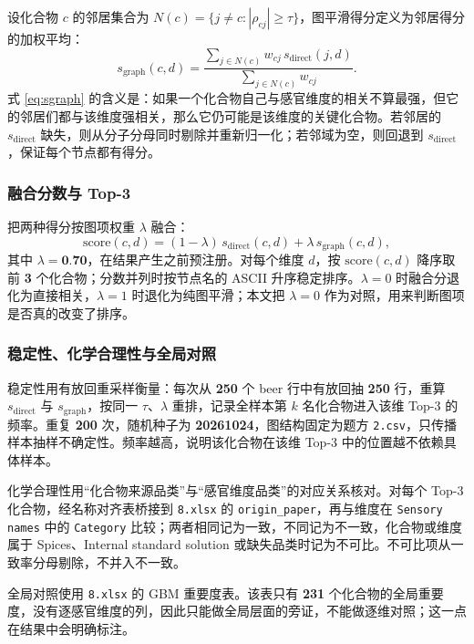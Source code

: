 设化合物 $c$ 的邻居集合为 $N(c)=\{j\ne c:|\rho_{cj}|\ge\tau\}$，图平滑得分定义为邻居得分的加权平均：
\begin{equation}
s_{\mathrm{graph}}(c,d)=\frac{\sum_{j\in N(c)}w_{cj}\,s_{\mathrm{direct}}(j,d)}
{\sum_{j\in N(c)}w_{cj}}.
\label{eq:sgraph}
\end{equation}
式 \eqref{eq:sgraph} 的含义是：如果一个化合物自己与感官维度的相关不算最强，但它的邻居们都与该维度强相关，那么它仍可能是该维度的关键化合物。若邻居的 $s_{\mathrm{direct}}$ 缺失，则从分子分母同时剔除并重新归一化；若邻域为空，则回退到 $s_{\mathrm{direct}}$，保证每个节点都有得分。

\subsubsection{融合分数与 Top-3}

把两种得分按图项权重 $\lambda$ 融合：
\begin{equation}
\mathrm{score}(c,d)=(1-\lambda)\,s_{\mathrm{direct}}(c,d)+
\lambda\,s_{\mathrm{graph}}(c,d),
\label{eq:score}
\end{equation}
其中 $\lambda=\textbf{0.70}$，在结果产生之前预注册。对每个维度 $d$，按 $\mathrm{score}(c,d)$ 降序取前 \textbf{3} 个化合物；分数并列时按节点名的 ASCII 升序稳定排序。$\lambda=0$ 时融合分退化为直接相关，$\lambda=1$ 时退化为纯图平滑；本文把 $\lambda=0$ 作为对照，用来判断图项是否真的改变了排序。

\subsubsection{稳定性、化学合理性与全局对照}

稳定性用有放回重采样衡量：每次从 \textbf{250} 个 beer 行中有放回抽 \textbf{250} 行，重算 $s_{\mathrm{direct}}$ 与 $s_{\mathrm{graph}}$，按同一 $\tau$、$\lambda$ 重排，记录全样本第 $k$ 名化合物进入该维 Top-3 的频率。重复 \textbf{200} 次，随机种子为 \textbf{20261024}，图结构固定为题方 \texttt{2.csv}，只传播样本抽样不确定性。频率越高，说明该化合物在该维 Top-3 中的位置越不依赖具体样本。

化学合理性用“化合物来源品类”与“感官维度品类”的对应关系核对。对每个 Top-3 化合物，经名称对齐表桥接到 \texttt{8.xlsx} 的 \texttt{origin\_paper}，再与维度在 \texttt{Sensory names} 中的 \texttt{Category} 比较；两者相同记为一致，不同记为不一致，化合物或维度属于 Spices、Internal standard solution 或缺失品类时记为不可比。不可比项从一致率分母剔除，不并入不一致。

全局对照使用 \texttt{8.xlsx} 的 GBM 重要度表。该表只有 \textbf{231} 个化合物的全局重要度，没有逐感官维度的列，因此只能做全局层面的旁证，不能做逐维对照；这一点在结果中会明确标注。


